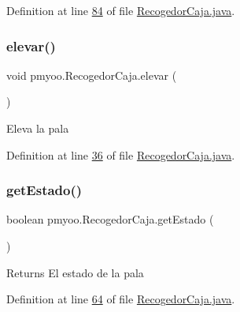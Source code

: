 Definition at line \mbox{\hyperlink{_recogedor_caja_8java_source_l00084}{84}} of file \mbox{\hyperlink{_recogedor_caja_8java_source}{Recogedor\+Caja.\+java}}.

\mbox{\label{classpmyoo_1_1_recogedor_caja_a94c5cdce71ce343490aa39101e551717}} 
\subsubsection{\texorpdfstring{elevar()}{elevar()}}
{\footnotesize\ttfamily void pmyoo.\+Recogedor\+Caja.\+elevar (\begin{DoxyParamCaption}{ }\end{DoxyParamCaption})}

Eleva la pala 

Definition at line \mbox{\hyperlink{_recogedor_caja_8java_source_l00036}{36}} of file \mbox{\hyperlink{_recogedor_caja_8java_source}{Recogedor\+Caja.\+java}}.

\mbox{\label{classpmyoo_1_1_recogedor_caja_a6c8a3ab0cdcfe6037f82de19791dfa39}} 
\subsubsection{\texorpdfstring{getEstado()}{getEstado()}}
{\footnotesize\ttfamily boolean pmyoo.\+Recogedor\+Caja.\+get\+Estado (\begin{DoxyParamCaption}{ }\end{DoxyParamCaption})}

\begin{DoxyReturn}{Returns}
El estado de la pala 
\end{DoxyReturn}


Definition at line \mbox{\hyperlink{_recogedor_caja_8java_source_l00064}{64}} of file \mbox{\hyperlink{_recogedor_caja_8java_source}{Recogedor\+Caja.\+java}}.

\mbox{\label{classpmyoo_1_1_recogedor_caja_a3e34ca212881d63d8d9eb5657dcc2089}} 
